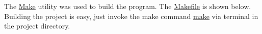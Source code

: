 The \url{Make} utility was used to build the program. The \url{Makefile} is shown below. Building the project is easy, just invoke the make command \url{make} via terminal in the project directory.
